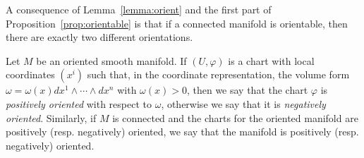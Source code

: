 A consequence of Lemma~\ref{lemma:orient} and the first part of Proposition~\ref{prop:orientable} is that if a connected manifold is orientable, then there are exactly two different orientations.

\begin{definition}
  Let $M$ be an oriented smooth manifold.
  If $(U,\varphi)$ is a chart with local coordinates $(x^i)$ such that, in the coordinate representation, the volume form $\omega = \omega(x) dx^1\wedge\cdots\wedge dx^n$ with $\omega(x) > 0$, then we say that the chart $\varphi$ is \emph{positively oriented} with respect to $\omega$, otherwise we say that it is \emph{negatively oriented}.
  Similarly, if $M$ is connected and the charts for the oriented manifold are positively (resp. negatively) oriented, we say that the manifold is positively (resp. negatively) oriented.
\end{definition}
%
% 

